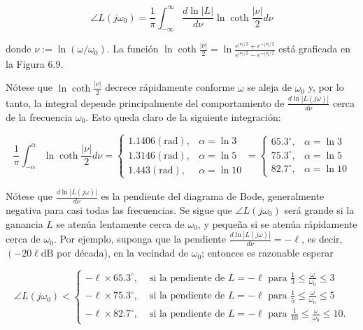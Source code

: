 \begin{equation*}
\angle L\left(j \omega_{0}\right)=\frac{1}{\pi} \int_{-\infty}^{\infty} \frac{d \ln |L|}{d \nu} \ln \operatorname{coth} \frac{|\nu|}{2} d \nu \tag{6.11}
\end{equation*}


donde $\nu:=\ln \left(\omega / \omega_{0}\right)$. La función $\ln \operatorname{coth} \frac{|\nu|}{2}=\ln \frac{e^{|\nu| / 2}+e^{-|\nu| / 2}}{e^{|\nu| / 2}-e^{-|\nu| / 2}}$ está graficada en la Figura 6.9.

Nótese que $\ln \operatorname{coth} \frac{|\nu|}{2}$ decrece rápidamente conforme $\omega$ se aleja de $\omega_{0}$ y, por lo tanto, la integral depende principalmente del comportamiento de $\frac{d \ln |L(j \omega)|}{d \nu}$ cerca de la frecuencia $\omega_{0}$. Esto queda claro de la siguiente integración:

$$
\frac{1}{\pi} \int_{-\alpha}^{\alpha} \ln \operatorname{coth} \frac{|\nu|}{2} d \nu=\left\{\begin{array}{ll}
1.1406(\mathrm{rad}), & \alpha=\ln 3 \\
1.3146(\mathrm{rad}), & \alpha=\ln 5 \\
1.443(\mathrm{rad}), & \alpha=\ln 10
\end{array}= \begin{cases}65.3^{\circ}, & \alpha=\ln 3 \\
75.3^{\circ}, & \alpha=\ln 5 \\
82.7^{\circ}, & \alpha=\ln 10\end{cases}\right.
$$


Nótese que $\frac{d \ln |L(j \omega)|}{d \nu}$ es la pendiente del diagrama de Bode, generalmente negativa para casi todas las frecuencias. Se sigue que $\angle L\left(j \omega_{0}\right)$ será grande si la ganancia $L$ se atenúa lentamente cerca de $\omega_{0}$, y pequeña si se atenúa rápidamente cerca de $\omega_{0}$. Por ejemplo, suponga que la pendiente $\frac{d \ln |L(j \omega)|}{d \nu}=-\ell$, es decir, $\left(-20 \ell \mathrm{dB}\right.$ por década), en la vecindad de $\omega_{0}$; entonces es razonable esperar

$$
\angle L\left(j \omega_{0}\right)< \begin{cases}-\ell \times 65.3^{\circ}, & \text { si la pendiente de } L=-\ell \text { para } \frac{1}{3} \leq \frac{\omega}{\omega_{0}} \leq 3 \\ -\ell \times 75.3^{\circ}, & \text { si la pendiente de } L=-\ell \text { para } \frac{1}{5} \leq \frac{\omega}{\omega_{0}} \leq 5 \\ -\ell \times 82.7^{\circ}, & \text { si la pendiente de } L=-\ell \text { para } \frac{1}{10} \leq \frac{\omega}{\omega_{0}} \leq 10 .\end{cases}
$$

